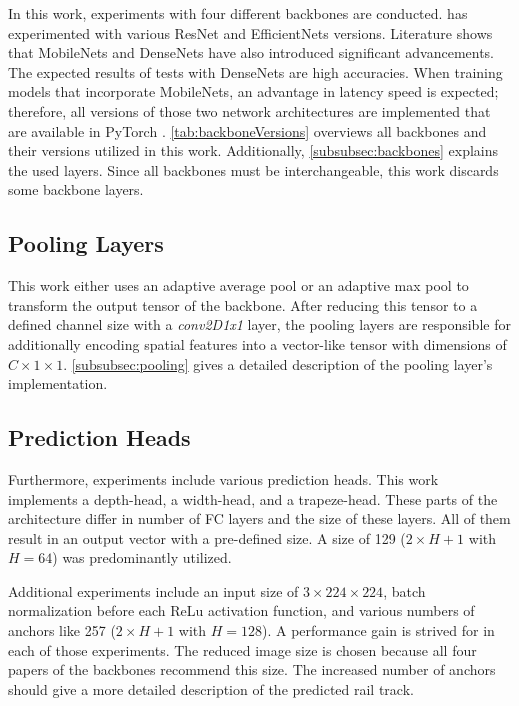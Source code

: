 In this work, experiments with four different backbones are conducted.
\cite{tepNet2024} has experimented with various ResNet and EfficientNets versions.
Literature shows that MobileNets and DenseNets have also introduced significant advancements.
The expected results of tests with DenseNets are high accuracies.
When training models that incorporate MobileNets, an advantage in latency speed is expected;
therefore, all versions of those two network architectures are implemented that are available in PyTorch \cite{pytorchmobilenetv3} \cite{pytorchdensenet}.
\autoref{tab:backboneVersions} overviews all backbones and their versions utilized in this work.
Additionally, \autoref{subsubsec:backbones} explains the used layers.
Since all backbones must be interchangeable, this work discards some backbone layers.

\subsection{Pooling Layers}

This work either uses an adaptive average pool or an adaptive max pool to transform the output tensor of the backbone.
After reducing this tensor to a defined channel size with a \textit{conv2D1x1} layer, the pooling layers are responsible for additionally encoding spatial features into a vector-like tensor with dimensions of $C \times 1 \times 1$.
\autoref{subsubsec:pooling} gives a detailed description of the pooling layer's implementation.

\subsection{Prediction Heads}

Furthermore, experiments include various prediction heads.
This work implements a depth-head, a width-head, and a trapeze-head.
These parts of the architecture differ in number of \ac{FC} layers and the size of these layers.
All of them result in an output vector with a pre-defined size.
A size of 129 ($2 \times H + 1$ with $H = 64$) was predominantly utilized.

\vspace{1cm}

Additional experiments include an input size of $3 \times 224 \times 224$, batch normalization before each ReLu activation function, and various numbers of anchors like 257 ($2 \times H + 1$ with $H = 128$).
A performance gain is strived for in each of those experiments.
The reduced image size is chosen because all four papers of the backbones recommend this size.
The increased number of anchors should give a more detailed description of the predicted rail track.